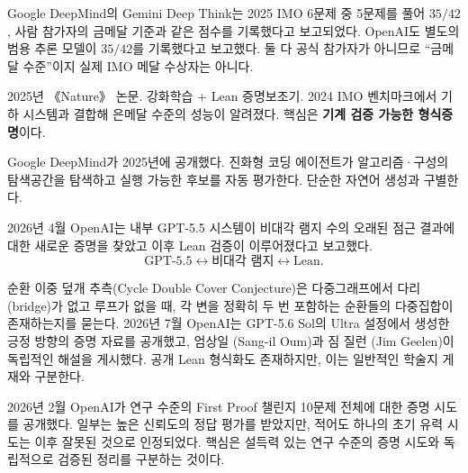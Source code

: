 
\begin{fact}
Google DeepMind의 Gemini Deep Think는 2025 IMO 6문제 중 5문제를 풀어 $35/42$, 사람 참가자의 금메달 기준과 같은 점수를 기록했다고 보고되었다.
OpenAI도 별도의 범용 추론 모델이 $35/42$를 기록했다고 보고했다.
둘 다 공식 참가자가 아니므로 ``금메달 수준''이지 실제 IMO 메달 수상자는 아니다.
\end{fact}

\begin{fact}[AlphaProof]
2025년 《Nature》 논문. 강화학습 + Lean 증명보조기.
2024 IMO 벤치마크에서 기하 시스템과 결합해 은메달 수준의 성능이 알려졌다.
핵심은 \textbf{기계 검증 가능한 형식증명}이다.
\end{fact}

\begin{fact}[AlphaEvolve]
Google DeepMind가 2025년에 공개했다. 진화형 코딩 에이전트가 알고리즘·구성의 탐색공간을 탐색하고 실행 가능한 후보를 자동 평가한다.
단순한 자연어 생성과 구별한다.
\end{fact}

\begin{fact}
2026년 4월 OpenAI는 내부 GPT-5.5 시스템이 비대각 램지 수의 오래된 점근 결과에 대한 새로운 증명을 찾았고
이후 Lean 검증이 이루어졌다고 보고했다.
\[
\text{GPT-5.5}\leftrightarrow\text{비대각 램지}\leftrightarrow\text{Lean}.
\]
\end{fact}

\begin{fact}
순환 이중 덮개 추측(Cycle Double Cover Conjecture)은 다중그래프에서 다리(bridge)가 없고 루프가 없을 때, 각 변을 정확히 두 번 포함하는 순환들의 다중집합이 존재하는지를 묻는다.
2026년 7월 OpenAI는 GPT-5.6 Sol의 Ultra 설정에서 생성한 긍정 방향의 증명 자료를 공개했고,
엄상일 (Sang-il Oum)과 짐 질런 (Jim Geelen)이 독립적인 해설을 게시했다. 공개 Lean 형식화도 존재하지만,
이는 일반적인 학술지 게재와 구분한다.
\end{fact}

\begin{fact}
2026년 2월 OpenAI가 연구 수준의 First Proof 챌린지 10문제 전체에 대한 증명 시도를 공개했다.
일부는 높은 신뢰도의 정답 평가를 받았지만, 적어도 하나의 초기 유력 시도는 이후 잘못된 것으로 인정되었다.
핵심은 설득력 있는 연구 수준의 증명 시도와 독립적으로 검증된 정리를 구분하는 것이다.
\end{fact}

